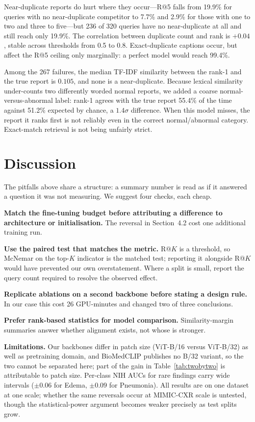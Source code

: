 \documentclass[runningheads]{llncs}
\begin{document}
Near-duplicate reports do hurt where they occur---R@5 falls from 19.9\% for
queries with no near-duplicate competitor to 7.7\% and 2.9\% for those with one
to two and three to five---but 236 of 320 queries have no near-duplicate at all
and still reach only 19.9\%. The correlation between duplicate count and rank is
$+0.04$, stable across thresholds from 0.5 to 0.8. Exact-duplicate captions
occur, but affect the R@5 ceiling only marginally: a perfect model would reach
99.4\%.

Among the 267 failures, the median TF-IDF similarity between the rank-1 and the
true report is $0.105$, and none is a near-duplicate. Because lexical similarity
under-counts two differently worded normal reports, we added a coarse
normal-versus-abnormal label: rank-1 agrees with the true report 55.4\% of the
time against 51.2\% expected by chance, a $1.4\sigma$ difference. When this model
misses, the report it ranks first is not reliably even in the correct
normal/abnormal category. Exact-match retrieval is not being unfairly strict.

\section{Discussion}

The pitfalls above share a structure: a summary number is read as if it answered
a question it was not measuring. We suggest four checks, each cheap.

\textbf{Match the fine-tuning budget before attributing a difference to
architecture or initialisation.} The reversal in Section~4.2 cost one additional
training run.

\textbf{Use the paired test that matches the metric.} R@$K$ is a threshold, so
McNemar on the top-$K$ indicator is the matched test; reporting it alongside R@$K$
would have prevented our own overstatement. Where a split is small, report the
query count required to resolve the observed effect.

\textbf{Replicate ablations on a second backbone before stating a design rule.}
In our case this cost 26 GPU-minutes and changed two of three conclusions.

\textbf{Prefer rank-based statistics for model comparison.} Similarity-margin
summaries answer whether alignment exists, not whose is stronger.

\textbf{Limitations.} Our backbones differ in patch size (ViT-B/16 versus
ViT-B/32) as well as pretraining domain, and BioMedCLIP publishes no B/32
variant, so the two cannot be separated here; part of the gain in
Table~\ref{tab:twobytwo} is attributable to patch size. Per-class NIH AUCs for
rare findings carry wide intervals ($\pm0.06$ for Edema, $\pm0.09$ for
Pneumonia). All results are on one dataset at one scale; whether the same
reversals occur at MIMIC-CXR scale is untested, though the statistical-power
argument becomes weaker precisely as test splits grow.
\end{document}
